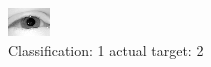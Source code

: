 \begin{figure}[h!]
\begin{center}
\includegraphics[width=0.60\columnwidth]{figures/ID2368_class_1_target_2.png}
\end{center}
\caption{ Classification: 1 actual target: 2}
\label{fig:ID2368_class_1_target_2}
\end{figure}
